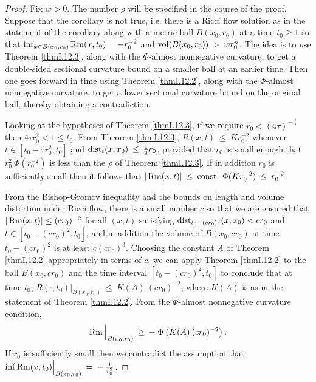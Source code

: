 \begin{proof}
Fix $w > 0$.
The number $\rho$ will be specified in the course of the proof.
Suppose that the corollary is not true, i.e.
there is a Ricci flow solution as in the statement of the corollary along
with a metric ball $B(x_0, r_0)$ at a time $t_0 \ge 1$
so that  $\inf_{x \in B(x_0,r_0)}  \operatorname{Rm}(x, t_0)  = - r_0^{-2}$
and $\operatorname{vol}(B(x_0, r_0)) \: > \: w r_0^n$.
The idea is to use
Theorem \ref{thmI.12.3}, along with the $\Phi$-almost nonnegative
curvature, to get a double-sided sectional
curvature bound on a smaller
ball at an earlier time. Then one goes forward in time using
Theorem \ref{thmI.12.2}, along with the $\Phi$-almost nonnegative
curvature, to get a lower sectional curvature bound on the
original ball, thereby obtaining a contradiction.

Looking at the hypotheses of Theorem \ref{thmI.12.3}, if
we require $r_0 < (4\tau)^{- \: \frac12}$ then
$4 \tau r_0^2 < 1 \le t_0$.
From Theorem \ref{thmI.12.3}, $R(x, t) \: \le \: K r_0^{-2}$
whenever  $t \in [t_0 - \tau r_0^2, t_0]$
and $\operatorname{dist}_t(x, x_0) \: \le \: \frac{1}{4} r_0$, provided that $r_0$ is
small enough that
$r_0^2 \: \Phi(r_0^{-2})$
is less than the $\rho$ of Theorem \ref{thmI.12.3}.
If in addition $r_0$ is sufficiently small then it follows that
$|\operatorname{Rm}(x,t)| \: \le \: \operatorname{const.} \: \Phi(K r_0^{-2}) \: \le \: r_0^{-2}$.

From the Bishop-Gromov inequality and the bounds on length and
volume distortion under Ricci flow, there is a small number $c$ so
that we are ensured that $|\operatorname{Rm}(x,t)| \le (cr_0)^{-2}$ for all $(x,t)$
satisfying $\operatorname{dist}_{t_0 - (cr_0)^2}(x, x_0) < cr_0$ and
$t \in [t_0 - (cr_0)^2, t_0]$, and in addition the volume of
$B(x_0, cr_0)$ at time $t_0 - (cr_0)^2$ is at least
$c(cr_0)^3$. Choosing the constant $A$ of Theorem \ref{thmI.12.2}
appropriately in terms of $c$, we can apply Theorem \ref{thmI.12.2}
to the ball $B(x_0, cr_0)$ and the time interval $[t_0 - (cr_0)^2, t_0]$
to conclude that at time $t_0$,
$R(\cdot, t_0) \Big|_{B(x_0, r_0)} \: \le \: K(A) \:
(cr_0)^{-2}$, where $K(A)$ is as in the statement of
Theorem \ref{thmI.12.2}.
From the $\Phi$-almost nonnegative curvature condition,
\begin{equation}
\operatorname{Rm} \Big|_{B(x_0, r_0)} \: \ge \: - \:
\Phi \left(K(A) \:
(cr_0)^{-2} \right).
\end{equation}
If $r_0$ is sufficiently small then we contradict the assumption that
$\inf \operatorname{Rm}(x, t_0)
\Big|_{B(x_0,r_0)} \: = \: - \:
\frac{1}{r_0^2}$.
\end{proof}

